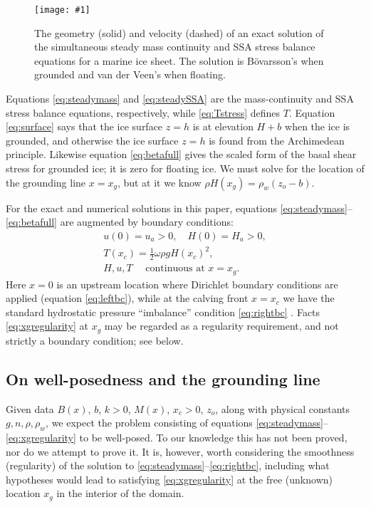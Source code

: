 \documentclass[review,letterpaper]{igs}
\renewcommand{\dh}{\fontencoding{T1}\selectfont{\symbol{240}}}
\newcommand{\onecol}[1]{\texttt{[image: \#1]}}
\newcommand{\bod}{B\"o\dh varsson\xspace}
\begin{document}
\begin{figure}[ht]
\onecol{exactmarine-geometry}
\caption{The geometry (solid) and velocity (dashed) of an exact solution of the simultaneous steady mass continuity and SSA stress balance equations for a marine ice sheet.  The solution is \bod's when grounded and van der Veen's when floating.} \label{fig:exactmarine}
\end{figure}

Equations \eqref{eq:steadymass} and \eqref{eq:steadySSA} are the mass-continuity and SSA stress balance equations, respectively, while \eqref{eq:Tstress} defines $T$.  Equation \eqref{eq:surface} says that the ice surface $z=h$ is at elevation $H+b$ when the ice is grounded, and otherwise the ice surface $z=h$ is found from the Archimedean principle.  Likewise equation \eqref{eq:betafull} gives the scaled form of the basal shear stress for grounded ice; it is zero for floating ice.  We must solve for the location of the grounding line $x=x_g$, but at it we know $\rho H(x_g) = \rho_w (z_o - b)$.

For the exact and numerical solutions in this paper, equations \eqref{eq:steadymass}--\eqref{eq:betafull} are augmented by boundary conditions:
\begin{gather}
u(0) = u_a > 0, \quad H(0) = H_a > 0, \label{eq:leftbc} \\
T(x_c) = \frac{1}{2} \omega \rho g H(x_c)^2,  \label{eq:rightbc} \\
H, u, T \quad \text{ continuous at } x = x_g.  \label{eq:xgregularity}
\end{gather}
Here $x=0$ is an upstream location where Dirichlet boundary conditions are applied (equation \eqref{eq:leftbc}), while at the calving front $x=x_c$ we have the standard hydrostatic pressure ``imbalance'' condition \eqref{eq:rightbc} \citep{SchoofMarine1}.  Facts \eqref{eq:xgregularity} at $x_g$ may be regarded as a regularity requirement, and not strictly a boundary condition; see below.

\subsection*{On well-posedness and the grounding line}  Given data $B(x)$, $b$, $k>0$, $M(x)$, $x_c>0$, $z_o$, along with physical constants $g,n,\rho,\rho_w$, we expect the problem consisting of equations \eqref{eq:steadymass}--\eqref{eq:xgregularity} to be well-posed.  To our knowledge this has not been proved, nor do we attempt to prove it.  It is, however, worth considering the smoothness (regularity) of the solution to \eqref{eq:steadymass}--\eqref{eq:rightbc}, including what hypotheses would lead to satisfying \eqref{eq:xgregularity} at the free (unknown) location $x_g$ in the interior of the domain.
\end{document}
